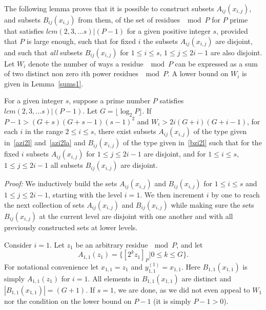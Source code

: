 The following lemma proves that it is possible to construct
subsets $A_{ij}(x_{i,j})$, and subsets $B_{ij}(x_{i,j})$ from
them, of the set of residues $\mod P$ for $P$ prime that satisfies
$lcm(2,3,...s) | (P-1)$ for a given positive integer $s$, provided
that $P$ is large enough, such that for fixed $i$ the subsets
$A_{ij}(x_{i,j})$ are disjoint, and such that \emph{all} subsets
$B_{ij}(x_{i,j})$ for $1 \leq i \leq s$, $1 \leq j \leq 2i-1$ are
also disjoint. Let $W_i$ denote the number of ways a residue $\mod
P$ can be expressed as a sum of two distinct non zero $i$th power
residues $\mod P$. A lower bound on $W_i$ is given in
Lemma~\ref{sums1}.
\begin{lemma}\label{lemmaw} For a given integer $s$, suppose a prime number $P$ satisfies $lcm(2,3,...s) |
(P-1)$. Let $G =\lfloor \log_2{P}\rfloor$. If $P-1 >
(G+s)(G+s-1)(s-1)^2$ and $W_i
> 2i(G+i)(G+i-1)$, for each $i$ in the range $2 \leq i \leq
s$, there exist subsets $A_{ij}(x_{i,j})$ of the type given
in~\eqref{azi2l} and~\eqref{azi2la} and $B_{ij}(x_{i,j})$ of the
type given in~\eqref{bzi2l}
 such that for the fixed $i$ subsets $A_{ij}(x_{i,j})$ for $1 \leq j \leq 2i-1$ are disjoint, and
for $1 \leq i \leq s$, $1 \leq j \leq 2i-1$ all subsets
$B_{ij}(x_{i,j})$ are disjoint.
\end{lemma}
\noindent \textit{Proof:} We inductively build the sets
$A_{ij}(x_{i,j})$ and $B_{ij}(x_{i,j})$ for $1 \leq i \leq s$ and
$1 \leq j \leq 2i-1$, starting with the level $i=1$. We then
increment $i$ by one to reach the next collection of sets
$A_{ij}(x_{i,j})$ and $B_{ij}(x_{i,j})$ while making sure the sets
$B_{ij}(x_{i,j})$ at the current level are disjoint with one
another and with all previously constructed sets at lower levels.

Consider $i=1$. Let $z_1$ be an arbitrary residue$~\mod P$, and
let \[A_{1,1}(z_1)=\{[2^{k}z_1]_P | 0 \leq k \leq G \}.\] For
notational convenience let $x_{1,1}=z_1$ and
$y_{1,1}^{(1)}=x_{1,1}$. Here $B_{1,1}(x_{1,1})$ is simply
$A_{1,1}(z_1)$ for $i=1$. All elements in $B_{1,1}(x_{1,1})$ are
distinct and $|B_{1,1}(x_{1,1})| =(G+1)$. If $s=1$, we are done,
as we did not even appeal to $W_1$ nor the condition on the lower
bound on $P-1$ (it is simply $P-1>0$).

